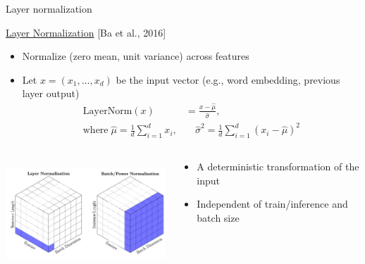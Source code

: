 \documentclass[usenames,dvipsnames,notes,11pt,aspectratio=169,hyperref={colorlinks=true, linkcolor=blue}]{beamer}
\begin{document}
\begin{frame}
    {Layer normalization}
    
    \href{https://arxiv.org/pdf/1607.06450.pdf}{Layer Normalization} [Ba et al., 2016]\\
    \begin{itemize}
        \item Normalize (zero mean, unit variance) across features
        \item Let $x=(x_1,\ldots,x_d)$ be the input vector (e.g., word embedding, previous layer output)
            \vspace{-1em}
            \begin{align*}
                \mathrm{LayerNorm}(x) &= \frac{x-\hat{\mu}}{\hat{\sigma}},\\
                \text{where} \; \hat{\mu} = \frac{1}{d}{\sum_{i=1}^d x_i}, &\quad \hat{\sigma}^2 = \frac{1}{d}{\sum_{i=1}^d (x_i-\hat{\mu})^2}
            \end{align*}
    \end{itemize}
    \pause
  
    \begin{columns}
        \begin{column}{0.5\textwidth}
            \includegraphics[height=4cm]{figures/batchnorm}
        \end{column}
        \begin{column}{0.5\textwidth}
    \begin{itemize}
    \item A deterministic transformation of the input
    \item Independent of train/inference and batch size
    \end{itemize}
        \end{column}
    \end{columns}
\end{frame}
\end{document}

